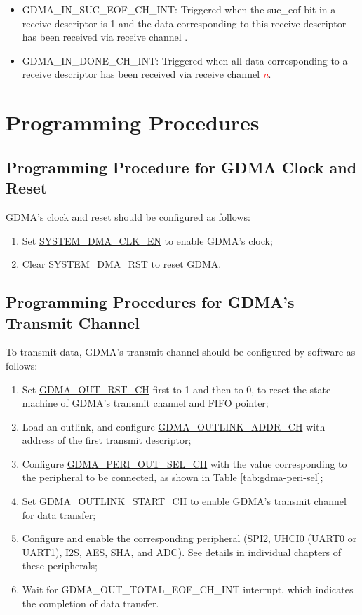 \documentclass[main\_\_EN.tex]{subfiles}
\begin{document}
\begin{itemize}
\item \label{int:GDMAINSUCEOFINT}GDMA\_IN\_SUC\_EOF\_CH\_INT: Triggered when the suc\_eof bit in a receive descriptor is 1 and the data corresponding to this receive descriptor has been received via receive channel .
\item \label{int:GDMAINDONEINT}GDMA\_IN\_DONE\_CH\_INT: Triggered when all data corresponding to a receive descriptor has been received via receive channel \textcolor{red}{\it{n}}.
\end{itemize}


\section{Programming Procedures}

\subsection{Programming Procedure for GDMA Clock and Reset}

GDMA's clock and reset should be configured as follows:
\begin{enumerate}
    \item Set \hyperref[fielddesc:SYSTEMDMACLKEN]{SYSTEM\_DMA\_CLK\_EN} to enable GDMA's clock;
    \item Clear \hyperref[fielddesc:SYSTEMDMARST]{SYSTEM\_DMA\_RST} to reset GDMA.
\end{enumerate}

\subsection{Programming Procedures for GDMA's Transmit Channel}

To transmit data, GDMA's transmit channel should be configured by software as follows:
\begin{enumerate}
    \item Set \hyperref[fielddesc:GDMAOUTRSTCHN]{GDMA\_OUT\_RST\_CH} first to 1 and then to 0, to reset the state machine of GDMA's transmit channel and FIFO pointer;
    \item Load an outlink, and configure \hyperref[fielddesc:GDMAOUTLINKADDRCHN]{GDMA\_OUTLINK\_ADDR\_CH}  with address of the first transmit descriptor;
    \item Configure \hyperref[fielddesc:GDMAPERIOUTSELCHN]{GDMA\_PERI\_OUT\_SEL\_CH} with the value corresponding to the peripheral to be connected, as shown in Table \ref{tab:gdma-peri-sel};
    \item Set \hyperref[fielddesc:GDMAOUTLINKSTARTCHN]{GDMA\_OUTLINK\_START\_CH} to enable GDMA's transmit channel for data transfer;
    \item Configure and enable the corresponding peripheral (SPI2, UHCI0 (UART0 or UART1), I2S, AES, SHA, and ADC). See details in individual chapters of these peripherals;
    \item Wait for GDMA\_OUT\_TOTAL\_EOF\_CH\_INT interrupt, which indicates the completion of data transfer.
\end{enumerate} 
\end{document}
